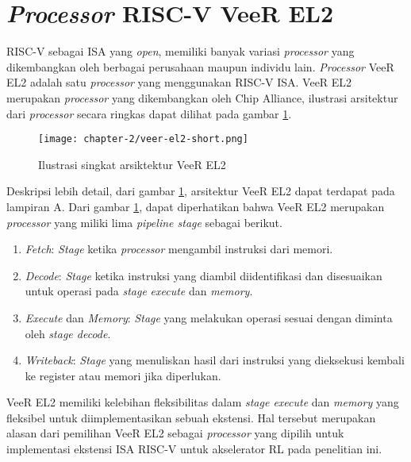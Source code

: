 \section{\textit{Processor} RISC-V VeeR EL2}
\label{sub:veer-el2}

RISC-V sebagai \ac{ISA} yang \textit{open}, memiliki banyak variasi \textit{processor} yang dikembangkan oleh berbagai perusahaan maupun individu lain. \textit{Processor} VeeR EL2 \parencite{chip2024cores} adalah satu \textit{processor} yang menggunakan RISC-V \ac{ISA}. VeeR EL2 merupakan \textit{processor} yang dikembangkan oleh Chip Alliance, ilustrasi arsitektur dari \textit{processor} secara ringkas dapat dilihat pada gambar \ref{fig:veer-el2-short}.

\begin{figure}[h]
	\centering
	\texttt{[image: chapter-2/veer-el2-short.png]}
	\caption{Ilustrasi singkat arsiktektur VeeR EL2 \parencite{chip2024cores}}
	\label{fig:veer-el2-short}
\end{figure}

Deskripsi lebih detail, dari gambar \ref{fig:veer-el2-short}, arsitektur VeeR EL2 dapat terdapat pada lampiran A. Dari gambar \ref{fig:veer-el2-short}, dapat diperhatikan bahwa VeeR EL2 merupakan \textit{processor} yang miliki lima \textit{pipeline stage} sebagai berikut.

\begin{enumerate}
	\setlength{\itemsep}{0pt}
	\setlength{\parskip}{0pt}
	\item \textit{Fetch}: \textit{Stage} ketika \textit{processor} mengambil instruksi dari memori.
	\item \textit{Decode}: \textit{Stage} ketika instruksi yang diambil diidentifikasi dan disesuaikan untuk operasi pada \textit{stage} \textit{execute} dan \textit{memory}.
	\item \textit{Execute} dan \textit{Memory}: \textit{Stage} yang melakukan operasi sesuai dengan diminta oleh \textit{stage decode}.
	\item \textit{Writeback}: \textit{Stage} yang menuliskan hasil dari instruksi yang dieksekusi kembali ke register atau memori jika diperlukan.
\end{enumerate}

VeeR EL2 memiliki kelebihan fleksibilitas dalam \textit{stage execute} dan \textit{memory} yang fleksibel untuk diimplementasikan sebuah ekstensi. Hal tersebut merupakan alasan dari pemilihan VeeR EL2 sebagai \textit{processor} yang dipilih untuk implementasi ekstensi \ac{ISA} RISC-V untuk akselerator \ac{RL} pada penelitian ini.
